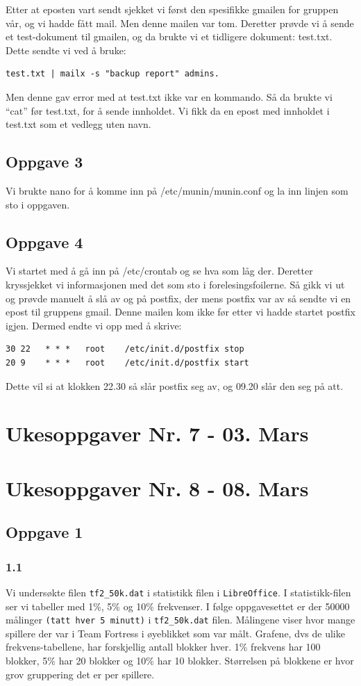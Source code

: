\documentclass[a4paper, norsk, 12pt]{article}
\begin{document}
Etter at eposten vart sendt sjekket vi først den spesifikke gmailen for gruppen vår, og vi hadde fått mail. Men denne mailen var tom. Deretter prøvde vi å sende et test-dokument til gmailen, og da brukte vi et tidligere dokument: test.txt. Dette sendte vi ved å bruke:
\begin{verbatim}
test.txt | mailx -s "backup report" admins. 
\end{verbatim}
Men denne gav error med at test.txt ikke var en kommando. Så da brukte vi “cat” før test.txt, for å sende innholdet. Vi fikk da en epost med innholdet i test.txt som et vedlegg uten navn.

\subsection{Oppgave 3}
Vi brukte nano for å komme inn på /etc/munin/munin.conf og la inn linjen som sto i oppgaven.

\subsection{Oppgave 4}
Vi startet med å gå inn på /etc/crontab og se hva som låg der. Deretter kryssjekket vi informasjonen med det som sto i forelesingsfoilerne. Så gikk vi ut og prøvde manuelt å slå av og på postfix, der mens postfix var av så sendte vi en epost til gruppens gmail. Denne mailen kom ikke før etter vi hadde startet postfix igjen. Dermed endte vi opp med å skrive:
\begin{verbatim}
30 22   * * *   root    /etc/init.d/postfix stop
20 9    * * *   root    /etc/init.d/postfix start
\end{verbatim}
Dette vil si at klokken 22.30 så slår postfix seg av, og 09.20 slår den seg på att.


\section{Ukesoppgaver Nr. 7 - 03. Mars}

\section{Ukesoppgaver Nr. 8 - 08. Mars}
\subsection{Oppgave 1}
\subsubsection*{1.1}
Vi undersøkte filen \verb|tf2_50k.dat| i statistikk filen i \verb|LibreOffice|. I statistikk-filen ser vi tabeller med 1\%, 5\% og 10\% frekvenser. I følge oppgavesettet er der 50000 målinger \verb|(tatt hver 5 minutt)| i \verb|tf2_50k.dat| filen.  Målingene viser hvor mange spillere der var i Team Fortress i øyeblikket som var målt. Grafene, dvs de ulike frekvens-tabellene, har forskjellig antall blokker hver. 1\% frekvens har 100 blokker, 5\% har 20 blokker og 10\% har 10 blokker. Størrelsen på blokkene er hvor grov gruppering det er per spillere.\\
\end{document}
